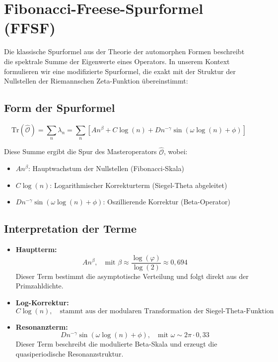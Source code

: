 \section{Fibonacci-Freese-Spurformel (FFSF)}

Die klassische Spurformel aus der Theorie der automorphen Formen beschreibt die spektrale Summe der Eigenwerte eines Operators. In unserem Kontext formulieren wir eine modifizierte Spurformel, die exakt mit der Struktur der Nullstellen der Riemannschen Zeta-Funktion übereinstimmt:

\subsection{Form der Spurformel}

\[
\boxed{
\mathrm{Tr}(\hat{\mathcal{O}}) = \sum_{n} \lambda_n 
= \sum_{n} \left[ A n^{\beta} + C \log(n) + D n^{-\gamma} \sin(\omega \log(n) + \phi) \right]
}
\]

Diese Summe ergibt die Spur des Masteroperators \(\hat{\mathcal{O}}\), wobei:

\begin{itemize}
    \item \(A n^{\beta}\): Hauptwachstum der Nullstellen (Fibonacci-Skala)
    \item \(C \log(n)\): Logarithmischer Korrekturterm (Siegel-Theta abgeleitet)
    \item \(D n^{-\gamma} \sin(\omega \log(n) + \phi)\): Oszillierende Korrektur (Beta-Operator)
\end{itemize}

\subsection{Interpretation der Terme}

\begin{itemize}
    \item \textbf{Hauptterm:}
    \[
    A n^{\beta}, \quad \text{mit } \beta \approx \frac{\log(\varphi)}{\log(2)} \approx 0{,}694
    \]
    Dieser Term bestimmt die asymptotische Verteilung und folgt direkt aus der Primzahldichte.

    \item \textbf{Log-Korrektur:}
    \[
    C \log(n), \quad \text{stammt aus der modularen Transformation der Siegel-Theta-Funktion}
    \]

    \item \textbf{Resonanzterm:}
    \[
    D n^{-\gamma} \sin(\omega \log(n) + \phi), \quad \text{mit } \omega \sim 2\pi \cdot 0{,}33
    \]
    Dieser Term beschreibt die modulierte Beta-Skala und erzeugt die quasiperiodische Resonanzstruktur.
\end{itemize}


